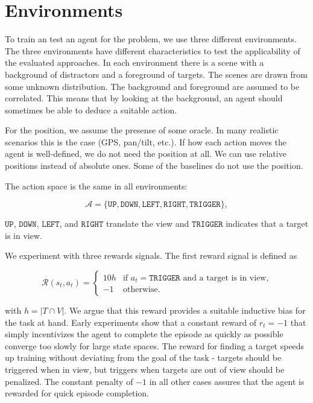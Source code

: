 \section{Environments}
\label{sec:environments}

To train an test an agent for the problem, we use three different environments.
The three environments have different characteristics to test the applicability of the evaluated approaches.
In each environment there is a scene with a background of distractors and a foreground of targets.
The scenes are drawn from some unknown distribution.
The background and foreground are assumed to be correlated.
This means that by looking at the background, an agent should sometimes be able to deduce a suitable action.

For the position, we assume the presense of some oracle.
In many realistic scenarios this is the case (GPS, pan/tilt, etc.).
If how each action moves the agent is well-defined, we do not need the position at all.
We can use relative positions instead of absolute ones.
Some of the baselines do not use the position.

The action space is the same in all environments:

\[
    \mathcal{A} = \lbrace \mathtt{UP}, \mathtt{DOWN}, \mathtt{LEFT}, \mathtt{RIGHT}, \mathtt{TRIGGER} \rbrace,
\]

\(\mathtt{UP}\), \(\mathtt{DOWN}\), \(\mathtt{LEFT}\), and \(\mathtt{RIGHT}\) translate the view and \(\mathtt{TRIGGER}\) indicates that a target is in view.

We experiment with three rewards signals.
The first reward signal is defined as

\[
    \mathcal{R}(s_t, a_t) =
    \begin{cases}
        10h & \text{if \(a_t = \mathtt{TRIGGER}\) and a target is in view,} \\
        -1  & \text{otherwise.}
    \end{cases}
\]

with \(h = \left\lvert T \cap V \right\rvert\). 
We argue that this reward provides a suitable inductive bias for the task at hand.
Early experiments show that a constant reward of \(r_t = -1\) that simply incentivizes the agent to complete the episode as quickly as possible converge too slowly for large state spaces.
The reward for finding a target speeds up training without deviating from the goal of the task -
targets should be triggered when in view, but triggers when targets are out of view should be penalized.
The constant penalty of \(-1\) in all other cases assures that the agent is rewarded for quick episode completion.

